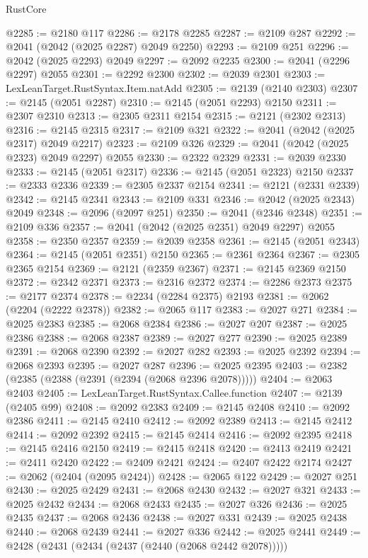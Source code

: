 \begin{lexlean}{RustCore}
\begin{coremodule}
@2285 := @2180 @117
@2286 := @2178 @2285
@2287 := @2109 @287
@2292 := @2041 (@2042 (@2025 @2287) @2049 @2250)
@2293 := @2109 @251
@2296 := @2042 (@2025 @2293) @2049
@2297 := @2092 @2235
@2300 := @2041 (@2296 @2297) @2055
@2301 := @2292 @2300
@2302 := @2039 @2301
@2303 := LexLeanTarget.RustSyntax.Item.natAdd
@2305 := @2139 (@2140 @2303)
@2307 := @2145 (@2051 @2287)
@2310 := @2145 (@2051 @2293) @2150
@2311 := @2307 @2310
@2313 := @2305 @2311 @2154
@2315 := @2121 (@2302 @2313)
@2316 := @2145 @2315
@2317 := @2109 @321
@2322 := @2041 (@2042 (@2025 @2317) @2049 @2217)
@2323 := @2109 @326
@2329 := @2041 (@2042 (@2025 @2323) @2049 @2297) @2055
@2330 := @2322 @2329
@2331 := @2039 @2330
@2333 := @2145 (@2051 @2317)
@2336 := @2145 (@2051 @2323) @2150
@2337 := @2333 @2336
@2339 := @2305 @2337 @2154
@2341 := @2121 (@2331 @2339)
@2342 := @2145 @2341
@2343 := @2109 @331
@2346 := @2042 (@2025 @2343) @2049
@2348 := @2096 (@2097 @251)
@2350 := @2041 (@2346 @2348)
@2351 := @2109 @336
@2357 := @2041 (@2042 (@2025 @2351) @2049 @2297) @2055
@2358 := @2350 @2357
@2359 := @2039 @2358
@2361 := @2145 (@2051 @2343)
@2364 := @2145 (@2051 @2351) @2150
@2365 := @2361 @2364
@2367 := @2305 @2365 @2154
@2369 := @2121 (@2359 @2367)
@2371 := @2145 @2369 @2150
@2372 := @2342 @2371
@2373 := @2316 @2372
@2374 := @2286 @2373
@2375 := @2177 @2374
@2378 := @2234 (@2284 @2375) @2193
@2381 := @2062 (@2204 (@2222 @2378))
@2382 := @2065 @117
@2383 := @2027 @271
@2384 := @2025 @2383
@2385 := @2068 @2384
@2386 := @2027 @207
@2387 := @2025 @2386
@2388 := @2068 @2387
@2389 := @2027 @277
@2390 := @2025 @2389
@2391 := @2068 @2390
@2392 := @2027 @282
@2393 := @2025 @2392
@2394 := @2068 @2393
@2395 := @2027 @287
@2396 := @2025 @2395
@2403 := @2382 (@2385 (@2388 (@2391 (@2394 (@2068 @2396 @2078)))))
@2404 := @2063 @2403
@2405 := LexLeanTarget.RustSyntax.Callee.function
@2407 := @2139 (@2405 @99)
@2408 := @2092 @2383
@2409 := @2145 @2408
@2410 := @2092 @2386
@2411 := @2145 @2410
@2412 := @2092 @2389
@2413 := @2145 @2412
@2414 := @2092 @2392
@2415 := @2145 @2414
@2416 := @2092 @2395
@2418 := @2145 @2416 @2150
@2419 := @2415 @2418
@2420 := @2413 @2419
@2421 := @2411 @2420
@2422 := @2409 @2421
@2424 := @2407 @2422 @2174
@2427 := @2062 (@2404 (@2095 @2424))
@2428 := @2065 @122
@2429 := @2027 @251
@2430 := @2025 @2429
@2431 := @2068 @2430
@2432 := @2027 @321
@2433 := @2025 @2432
@2434 := @2068 @2433
@2435 := @2027 @326
@2436 := @2025 @2435
@2437 := @2068 @2436
@2438 := @2027 @331
@2439 := @2025 @2438
@2440 := @2068 @2439
@2441 := @2027 @336
@2442 := @2025 @2441
@2449 := @2428 (@2431 (@2434 (@2437 (@2440 (@2068 @2442 @2078)))))

\end{coremodule}
\end{lexlean}
